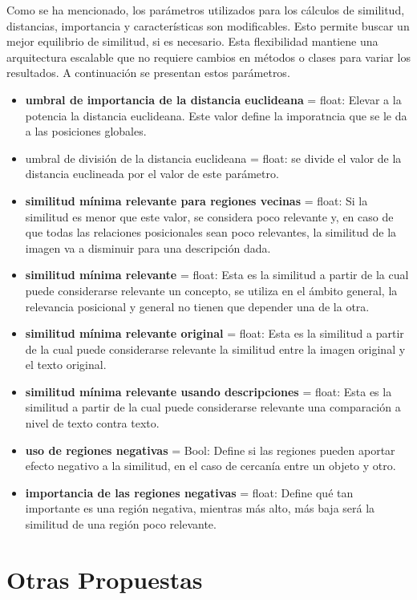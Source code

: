Como se ha mencionado, los parámetros utilizados para los cálculos de similitud, distancias, importancia y características son modificables. Esto permite buscar un mejor equilibrio de similitud, si es necesario. Esta flexibilidad mantiene una arquitectura escalable que no requiere cambios en métodos o clases para variar los resultados. A continuación se presentan estos parámetros.
\begin{itemize}
    \item \textbf{umbral de importancia de la distancia euclideana} = float: Elevar a la potencia la distancia euclideana. Este valor define la imporatncia que se le da a las posiciones globales.
    \item umbral de divisi\'on de la distancia euclideana = float: se divide el valor de la distancia euclineada por el valor de este par\'ametro.
    \item \textbf{similitud m\'inima relevante para regiones vecinas} = float: Si la similitud es menor que este valor, se considera poco relevante y, en caso de que todas las relaciones posicionales sean poco relevantes, la similitud de la imagen va a disminuir para una descripci\'on dada.
    \item \textbf{similitud m\'inima relevante} = float: Esta es la similitud a partir de la cual puede considerarse relevante un concepto, se utiliza en el \'ambito general, la relevancia posicional y general no tienen que depender una de la otra.
    \item \textbf{similitud m\'inima relevante original} = float: Esta es la similitud a partir de la cual puede considerarse relevante la similitud entre la imagen original y el texto original.
    \item \textbf{similitud m\'inima relevante usando descripciones} = float: Esta es la similitud a partir de la cual puede considerarse relevante una comparación a nivel de texto contra texto. 
    \item \textbf{uso de regiones negativas} = Bool: Define si las regiones pueden aportar efecto negativo a la similitud, en el caso de cercan\'ia entre un objeto y otro.
    \item \textbf{importancia de las regiones negativas} = float: Define qu\'e tan importante es una regi\'on negativa, mientras m\'as alto, m\'as baja ser\'a la similitud de una regi\'on poco relevante.
\end{itemize}

\section{Otras Propuestas}

